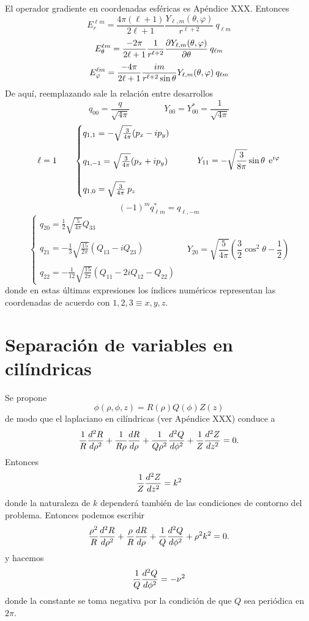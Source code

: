\documentclass[10pt,oneside]{CBFT_book}
\begin{document}
El operador gradiente en coordenadas esféricas es Apéndice XXX.
Entonces
\[
	E_r^{\ell m} = \frac{4\pi(\ell+1)}{ 2\ell+1 } 
	\frac{Y_{\ell,m}(\theta,\varphi) }{r^{\ell+2}} \: q_{\ell m}
\]
\[
	E_\theta^{\ell m} = \frac{-2\pi}{2\ell+1} \frac{1}{r^{\ell+2}}
	\dpar{Y_{\ell,m}(\theta,\varphi) }{\theta} \: q_{\ell m}
\]
\[
	E_\vp^{\ell m} = \frac{-4\pi}{2\ell+1} \frac{ i m}{r^{\ell+2}\sin\theta} 
	Y_{\ell,m}(\theta,\varphi) \: q_{\ell m}
\]
De aquí, reemplazando sale la relación entre desarrollos
\[
	q_{00} = \frac{q}{\sqrt{4\pi}} \qquad \qquad Y_{00} = Y_{00}^* = \frac{1}{\sqrt{4\pi}}
\]
\[
	\ell = 1 \qquad 
	\begin{cases}
	q_{1,1} = - \sqrt{\frac{3}{4\pi}}( p_x -i p_y ) \\
	\\
	 q_{1,-1} = \sqrt{\frac{3}{4\pi}}( p_x + i p_y ) \\
	 \\
	 q_{1,0} = \sqrt{\frac{3}{4\pi}} \: p_z
	\end{cases}
	\qquad 
	Y_{11} = -\sqrt{\frac{3}{8\pi}}  \sin\theta \: \euler^{i\vp}
\]
\[
	(-1)^m q_{\ell m}^* = q_{\ell,-m}
\]
\[
	\begin{cases}
	q_{20} = \frac{1}{2} \sqrt{\frac{5}{4\pi}} Q_{33} \\
	\\
	 q_{21} = - \frac{1}{3} \sqrt{\frac{15}{2\pi}}( Q_{13} -i Q_{23} ) \\
	 \\
	 q_{22} = - \frac{1}{12} \sqrt{\frac{15}{2\pi}}( Q_{11} - 2 i Q_{12} - Q_{22} )	 
	\end{cases}
	\quad 
	Y_{20} = \sqrt{\frac{5}{4\pi}}\left(  \frac{3}{2} \cos^2\theta - \frac{1}{2} \right)	
\]
donde en estas últimas expresiones los índices numéricos representan las
coordenadas de acuerdo con $1,2,3 \equiv x,y,z$.

\section{Separación de variables en cilíndricas}

Se propone
\[
	\phi(\rho,\phi,z) = R(\rho) Q(\phi) Z(z)
\]
de modo que el laplaciano en cilíndricas (ver Apéndice XXX) conduce a
\[
	\frac{1}{R} \dtot[2]{R}{\rho} + \frac{1}{R\rho} \dtot{R}{\rho} + \frac{1}{Q\rho^2} \dtot[2]{Q}{\phi} 
				+ \frac{1}{Z} \dtot[2]{Z}{z} = 0.
\]
Entonces
\[
	\frac{1}{Z} \dtot[2]{Z}{z} = k^2
\]
donde la naturaleza de $k$ dependerá también de las condiciones de contorno
del problema.
Entonces podemos escribir
\[
	\frac{\rho^2}{R} \dtot[2]{R}{\rho} + 
	\frac{\rho}{R} \dtot{R}{\rho} + 
	\frac{1}{Q} \dtot[2]{Q}{\phi} 
	+ \rho^2 k^2 = 0.
\]
y hacemos
\[
	\frac{1}{Q} \dtot[2]{Q}{\phi} = -\nu^2
\]
donde la constante se toma negativa por la condición de que $Q$ sea periódica
en $2\pi$.
\end{document}
